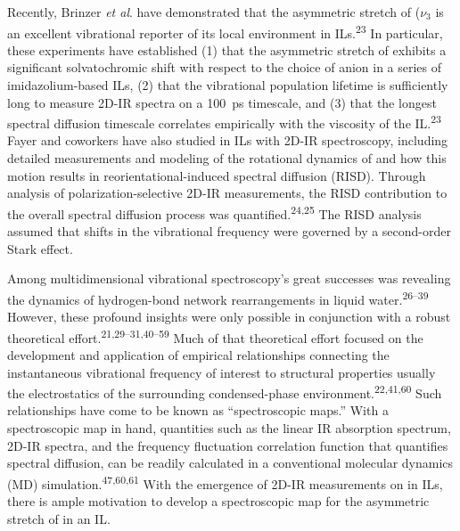 \documentclass[]{article}
\begin{document}
Recently, Brinzer \emph{et al}. have demonstrated that the asymmetric stretch of  (\(\nu_3\) is an excellent vibrational reporter of its local environment in ILs.\textsuperscript{23} In particular, these experiments have established (1) that the asymmetric stretch of  exhibits a significant solvatochromic shift with respect to the choice of anion in a series of imidazolium-based ILs, (2) that the  vibrational population lifetime is sufficiently long to measure 2D-IR spectra on a \SI{100}{\pico\second} timescale, and (3) that the longest spectral diffusion timescale correlates empirically with the viscosity of the IL.\textsuperscript{23} Fayer and coworkers have also studied  in ILs with 2D-IR spectroscopy, including detailed measurements and modeling of the rotational dynamics of  and how this motion results in reorientational-induced spectral diffusion (RISD). Through analysis of polarization-selective 2D-IR measurements, the RISD contribution to the overall spectral diffusion process was quantified.\textsuperscript{24,25} The RISD analysis assumed that shifts in the  vibrational frequency were governed by a second-order Stark effect.

Among multidimensional vibrational spectroscopy's great successes was revealing the dynamics of hydrogen-bond network rearrangements in liquid water.\textsuperscript{26--39} However, these profound insights were only possible in conjunction with a robust theoretical effort.\textsuperscript{21,29--31,40--59} Much of that theoretical effort focused on the development and application of empirical relationships connecting the instantaneous vibrational frequency of interest to structural properties \textemdash{} usually the electrostatics \textemdash{} of the surrounding condensed-phase environment.\textsuperscript{22,41,60} Such relationships have come to be known as ``spectroscopic maps.'' With a spectroscopic map in hand, quantities such as the linear IR absorption spectrum, 2D-IR spectra, and the frequency fluctuation correlation function that quantifies spectral diffusion, can be readily calculated in a conventional molecular dynamics (MD) simulation.\textsuperscript{47,60,61} With the emergence of 2D-IR measurements on  in ILs, there is ample motivation to develop a spectroscopic map for the asymmetric stretch of  in an IL.
\end{document}
